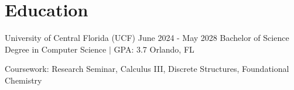 \section{Education}
\resumeSubHeadingListStart
\resumeSubheading
    {University of Central Florida (UCF)}
    {June 2024 - May 2028}
    {Bachelor of Science Degree in Computer Science $|$ GPA: 3.7}
    {Orlando, FL}
    \item\normalsize
    {Coursework: Research Seminar, Calculus III, Discrete Structures, Foundational Chemistry}
\resumeSubHeadingListEnd